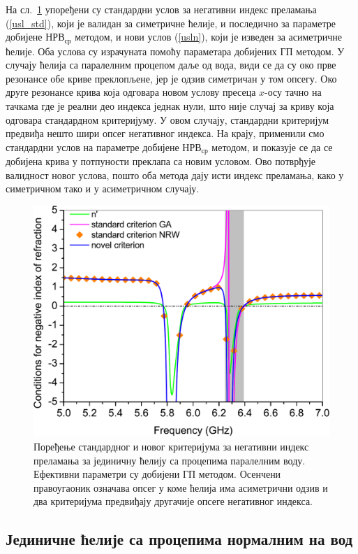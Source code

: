 На сл.~\ref{usl_par} упоређени су стандардни услов за негативни индекс преламања (\ref{usl_std}), који је валидан за симетричне ћелије, и последично за параметре добијене $НРВ_{ср}$ методом, и нови услов (\ref{usln}), који је изведен за асиметричне ћелије. Оба услова су израчуната помоћу параметара добијених ГП методом. У случају ћелија са паралелним процепом даље од вода, види се да су око прве резонансе обе криве преклопљене, јер је одзив симетричан у том опсегу. Око друге резонансе крива која одговара новом услову пресеца $x$-осу тачно на тачкама где је реални део индекса једнак нули, што није случај за криву која одговара стандардном критеријуму. У овом случају, стандардни критеријум предвиђа нешто шири опсег негативног индекса. На крају, применили смо стандардни услов на параметре добијене $НРВ_{ср}$ методом, и показује се да се добијена крива у потпуности преклапа са новим условом. Ово потврђује валидност новог услова, пошто оба метода дају исти индекс преламања, како у симетричном тако и у асиметричном случају.
\begin{figure}[!t]
\centering
\includegraphics[scale=\SkalaC]{slike/usl_par.pdf}
\caption{Поређење стандардног и новог критеријума за негативни индекс преламања за јединичну ћелију са процепима паралелним воду. Ефективни параметри су добијени ГП методом. Осенчени правоугаоник означава опсег у коме ћелија има асиметрични одзив и два критеријума предвиђају другачије опсеге негативног индекса.}
\label{usl_par}
\end{figure} 
	
\subsection{Јединичне ћелије са процепима нормалним на вод}

